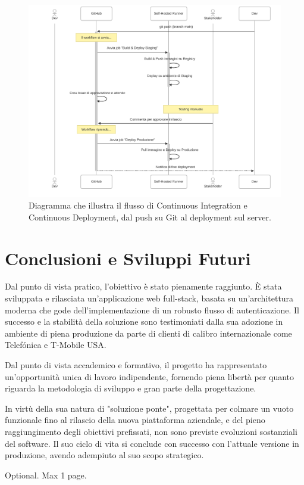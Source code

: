 \documentclass[12pt,a4paper,openright,twoside]{book}
\begin{document}
\begin{figure}[htbp]
    \centering
    \includegraphics[width=\textwidth]{figures/pipeline_sequence.pdf}
    \caption{Diagramma che illustra il flusso di Continuous Integration e Continuous Deployment, dal push su Git al deployment sul server.}
    \label{fig:ci_cd_diagram}
\end{figure}
\FloatBarrier


\chapter{Conclusioni e Sviluppi Futuri}
\label{chap:conclusioni}

Dal punto di vista pratico, l'obiettivo è stato pienamente raggiunto. È stata sviluppata e rilasciata un'applicazione web full-stack, basata su un'architettura moderna che gode dell'implementazione di un robusto flusso di autenticazione. Il successo e la stabilità della soluzione sono testimoniati dalla sua adozione in ambiente di piena produzione da parte di clienti di calibro internazionale come Telefónica e T-Mobile USA.

Dal punto di vista accademico e formativo, il progetto ha rappresentato un'opportunità unica di lavoro indipendente, fornendo piena libertà per quanto riguarda la metodologia di sviluppo e gran parte della progettazione.

In virtù della sua natura di "soluzione ponte", progettata per colmare un vuoto funzionale fino al rilascio della nuova piattaforma aziendale, e del pieno raggiungimento degli obiettivi prefissati, non sono previste evoluzioni sostanziali del software. Il suo ciclo di vita si conclude con successo con l'attuale versione in produzione, avendo adempiuto al suo scopo strategico.


\backmatter





\begin{acknowledgements}
    Optional. Max 1 page.
\end{acknowledgements}
\end{document}
